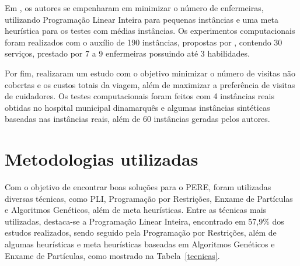 Em , os autores se empenharam em minimizar o número de enfermeiras, utilizando Programação Linear Inteira para pequenas instâncias e uma meta heurística para os testes com médias instâncias. 
Os experimentos computacionais foram realizados com o auxílio de 190 instâncias, propostas por , contendo 30 serviços, prestado por 7 a 9 enfermeiras possuindo até 3 habilidades. 

Por fim,  realizaram um estudo com o objetivo minimizar o número de visitas não cobertas e os custos totais da viagem, além de maximizar a preferência de visitas de cuidadores.
Os testes computacionais foram feitos com 4 instâncias reais obtidas no hospital municipal dinamarquês e algumas instâncias sintéticas baseadas nas instâncias reais, além de 60 instâncias geradas pelos autores.



\section{\esp Metodologias utilizadas }\label{metodologia}

Com o objetivo de encontrar boas soluções para o \ac{PERE}, foram utilizadas diversas técnicas, como \acl{PLI}, Programação por Restrições, Enxame de Partículas e Algoritmos Genéticos, além de meta heurísticas.
Entre as técnicas mais utilizadas, destaca-se a Programação Linear Inteira, encontrado em 57,9\% dos estudos realizados, sendo seguido pela Programação por Restrições, além de algumas heurísticas e meta heurísticas baseadas em Algoritmos Genéticos e Enxame de Partículas, como mostrado na Tabela~\ref{tecnicas}. 

